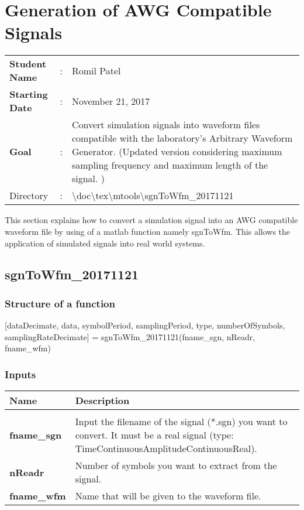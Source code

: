 \clearpage

\section{Generation of AWG Compatible Signals}
\begin{tcolorbox}	
\begin{tabular}{p{2.75cm} p{0.2cm} p{10.5cm}} 	
\textbf{Student Name}  &:& Romil Patel\\
\textbf{Starting Date} &:& November 21, 2017\\
\textbf{Goal}          &:& Convert simulation signals into waveform files compatible with the laboratory's Arbitrary Waveform Generator. (Updated version considering maximum sampling frequency and maximum length of the signal. )\\
Directory              &:& \textbackslash doc\textbackslash tex\textbackslash mtools\textbackslash sgnToWfm\_20171121
\end{tabular}
\end{tcolorbox}
This section explains how to convert a simulation signal into an AWG compatible waveform file by using of a matlab function namely sgnToWfm. This allows the application of simulated signals into real world systems.

\subsection{sgnToWfm\_20171121}

\subsubsection{Structure of a function}
[dataDecimate, data, symbolPeriod, samplingPeriod, type, numberOfSymbols, samplingRateDecimate]  = sgnToWfm\_20171121(fname\_sgn, nReadr, fname\_wfm)

\subsubsection*{Inputs}
\begin{tabular}{|p{2cm}||p{12cm}|}
\hline
\textbf{Name} &\textbf{Description}\\
\hline
\vspace{0.1cm}& \vspace{0.1cm}\\
\textbf{fname\_sgn} \vspace{0.25cm}& Input the filename of the signal (*.sgn) you want to convert. It must be a real signal (type: TimeContinuousAmplitudeContinuousReal).\vspace{0.25cm}\\

\textbf{nReadr} \vspace{0.25cm}& Number of symbols you want to extract from the signal.\vspace{0.25cm}\\

\textbf{fname\_wfm}\vspace{0.25cm}& Name that will be given to the waveform file.\vspace{0.25cm}\\
\hline
\end{tabular}

